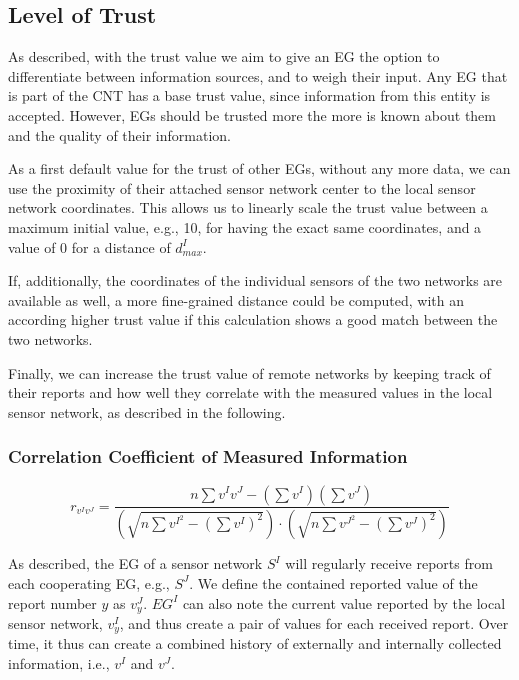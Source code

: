 \documentclass[onecolumn]{jaise2e}
\begin{document}
\subsection{Level of Trust}\label{subsec:trust_level}

As described, with the trust value we aim to give an EG the option to differentiate between information sources, and to weigh their input. Any EG that is part of the CNT has a base trust value, since information from this entity is accepted. However, EGs should be trusted more the more is known about them and the quality of their information.

As a first default value for the trust of other EGs, without any more data, we can use the proximity of their attached sensor network center to the local sensor network coordinates. This allows us to linearly scale the trust value between a maximum initial value, e.g., 10, for having the exact same coordinates, and a value of 0 for a distance of $d^I_{max}$.

If, additionally, the coordinates of the individual sensors of the two networks are available as well, a more fine-grained distance could be computed, with an according higher trust value if this calculation shows a good match between the two networks.

Finally, we can increase the trust value of remote networks by keeping track of their reports and how well they correlate with the measured values in the local sensor network, as described in the following.

\subsubsection{Correlation Coefficient of Measured Information}\label{subsubsec:coeff}

\begin{figure*}
\begin{equation} \label{Eq:correlation}
r_{v^I v^J} = \frac{n\sum v^I v^J - (\sum v^I)(\sum v^J)}{(\sqrt{n\sum v^{I^2}- (\sum v^I )^{2}})\cdot(\sqrt{n\sum v^{J^2}-(\sum v^J)^{2}})} 
\end{equation}
\end{figure*}


As described, the EG of a sensor network $S^I$ will regularly receive reports from each cooperating EG, e.g., $S^J$. We define the contained reported value of the report number $y$ as $v^J_y$. $EG^I$ can also note the current value reported by the local sensor network, $v^I_y$, and thus create a pair of values for each received report. Over time, it thus can create a combined history of externally and internally collected information, i.e., $v^I$ and $v^J$.
\end{document}
